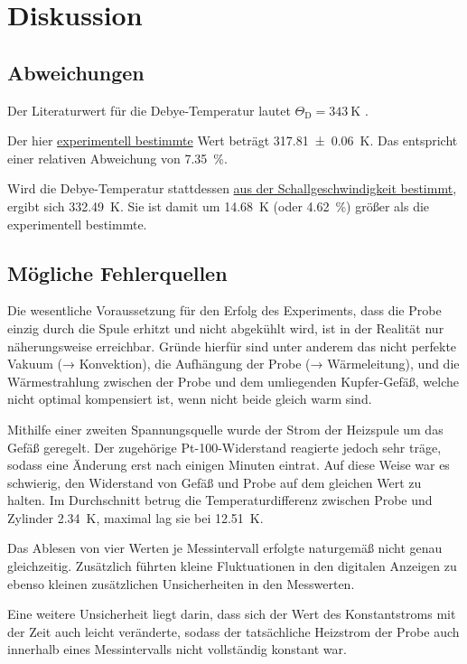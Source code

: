 \section{Diskussion}
\label{sec:diskussion}

\subsection{Abweichungen}

    Der Literaturwert für die Debye-Temperatur lautet $\Theta_\text{D} = \SI{343}{\kelvin}$ \cite[Abbildung 6.9]{grossmarx}.

    Der hier \hyperref[sec:auswertung:debye_exp]{experimentell bestimmte} Wert beträgt \SI{317.81(6)}{\kelvin}.
    Das entspricht einer relativen Abweichung von \SI{7.35}{\percent}.

    Wird die Debye-Temperatur stattdessen \hyperref[sec:auswertung:debye_vs]{aus der Schallgeschwindigkeit bestimmt},
    ergibt sich \SI{332.49}{\kelvin}.
    Sie ist damit um \SI{14.68}{\kelvin} (oder \SI{4.62}{\percent}) größer als die experimentell bestimmte.


\subsection{Mögliche Fehlerquellen}


    Die wesentliche Voraussetzung für den Erfolg des Experiments,
    dass die Probe einzig durch die Spule erhitzt und nicht abgekühlt wird,
    ist in der Realität nur näherungsweise erreichbar.
    Gründe hierfür sind unter anderem
    das nicht perfekte Vakuum (→ Konvektion),
    die Aufhängung der Probe (→ Wärmeleitung), %
    und die Wärmestrahlung zwischen der Probe und dem umliegenden Kupfer-Gefäß,
    welche nicht optimal kompensiert ist,
    wenn nicht beide gleich warm sind.

    Mithilfe einer zweiten Spannungsquelle wurde der Strom der Heizspule um das Gefäß geregelt.
    Der zugehörige Pt-100-Widerstand reagierte jedoch sehr träge,
    sodass eine Änderung erst nach einigen Minuten eintrat.
    Auf diese Weise war es schwierig,
    den Widerstand von Gefäß und Probe auf dem gleichen Wert zu halten.
    Im Durchschnitt betrug die Temperaturdifferenz zwischen Probe und Zylinder \SI{2.34}{\kelvin},
    maximal lag sie bei \SI{12.51}{\kelvin}.

    Das Ablesen von vier Werten je Messintervall erfolgte naturgemäß nicht genau gleichzeitig.
    Zusätzlich führten kleine Fluktuationen in den digitalen Anzeigen
    zu ebenso kleinen zusätzlichen Unsicherheiten in den Messwerten.

    Eine weitere Unsicherheit liegt darin,
    dass sich der Wert des Konstantstroms mit der Zeit auch leicht veränderte,
    sodass der tatsächliche Heizstrom der Probe
    auch innerhalb eines Messintervalls nicht vollständig konstant war.
